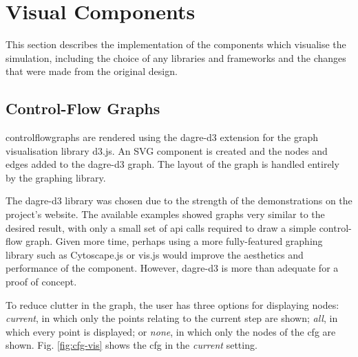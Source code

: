 \documentclass[bsc,twoside,singlespacing,parskip,logo,notimes,normalheadings]{infthesis}
\begin{document}
    \section{Visual Components}
    This section describes the implementation of the components which
    visualise the simulation, including the choice of any libraries
    and frameworks and the changes that were made from the original
    design.

        \subsection{Control-Flow Graphs}  
        \Gls{controlflowgraph}s are rendered using the dagre-d3
        extension for the graph visualisation library d3.js. An SVG
        component is created and the nodes and edges added to the
        dagre-d3 graph. The layout of the graph is handled entirely by
        the graphing library.

        The dagre-d3 library was chosen due to the strength of the
        demonstrations on the project's website\cite{dagre-demos}. The
        available examples showed graphs very similar to the desired
        result, with only a small set of \gls{api} calls required to
        draw a simple control-flow graph. Given more time, perhaps
        using a more fully-featured graphing library such as
        Cytoscape.js \cite{cytoscapejs} or vis.js \cite{vis.js} would
        improve the aesthetics and performance of the
        component. However, dagre-d3 is more than adequate for a proof
        of concept.



        To reduce clutter in the graph, the user has three options for
        displaying nodes: {\em current}, in which only the points
        relating to the current step are shown; {\em all}, in which
        every point is displayed; or {\em none}, in which only the
        nodes of the \gls{cfg} are shown. Fig. \ref{fig:cfg-vis} shows
        the \gls{cfg} in the {\em current} setting.
\end{document}
